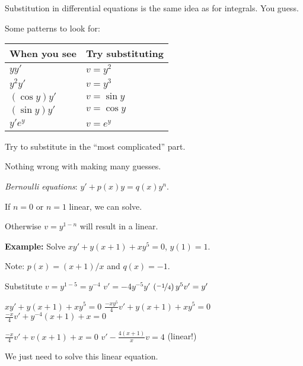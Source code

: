 \documentclass[10pt,aspectratio=169]{beamer}
\begin{document}
\begin{frame}

Substitution in differential equations
is the same idea as for integrals.  You guess.

\medskip
\pause

Some patterns to look for:

\begin{center}
\begin{tabular}{@{}ll@{}}
\toprule
When you see & Try substituting \\
\midrule
$yy'$ & $v=y^2$ \\
$y^2y'$ & $v=y^3$ \\
$(\cos y)y'$ & $v=\sin y$ \\
$(\sin y)y'$ & $v=\cos y$ \\
$y'e^y$ & $v=e^y$ \\ \bottomrule
\end{tabular}
\end{center}

\pause

Try to substitute in the ``most complicated'' part.

\medskip
\pause

Nothing wrong with making many guesses.

\end{frame}

\begin{frame}
\emph{Bernoulli equations}:
\quad $y' + p(x)y = q(x)y^n$.

\medskip
\pause

If $n=0$ or $n=1$ \wthus linear, we can solve.

\medskip
\pause

Otherwise $v=y^{1-n}$ will result in a linear.

\medskip
\pause

\textbf{Example:}
Solve
\quad
$xy'+ y(x+1)+xy^5 = 0$, \qquad $y(1)=1$.

\medskip
\pause

Note: $p(x) = (x+1)/x$ and $q(x) = -1$.

\medskip
\pause

Substitute
$v=y^{1-5} = y^{-4}$
\pause
\wthus
$v' = -4 y^{-5} y'$
\pause
\wthus
$\left( \nicefrac{-1}{4} \right) y^5 v' = y'$

\medskip
\pause

$xy'+ y(x+1)+xy^5 = 0$
\pause
\wthus
$\frac{-xy^5}{4} v'+ y(x+1)+xy^5 = 0$
\pause
\wthus
$\frac{-x}{4} v'+ y^{-4}(x+1)+x = 0$

\medskip

\pause
\wthus
$\frac{-x}{4} v'+ v(x+1)+x = 0$
\pause
\wthus
$v'- \frac{4(x+1)}{x} v  = 4$
\pause
\quad (linear!)

\medskip
\pause

We just need to solve this linear equation.

\end{frame}
\end{document}
